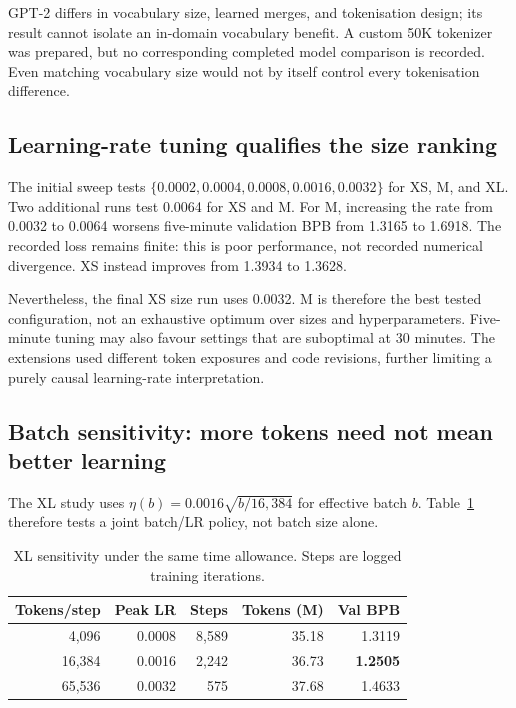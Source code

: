 \documentclass[11pt]{article}
\begin{document}
GPT-2 differs in vocabulary size, learned merges, and tokenisation design; its result cannot isolate an in-domain vocabulary benefit. A custom 50K tokenizer was prepared, but no corresponding completed model comparison is recorded. Even matching vocabulary size would not by itself control every tokenisation difference.

\subsection{Learning-rate tuning qualifies the size ranking}
The initial sweep tests $\{0.0002,0.0004,0.0008,0.0016,0.0032\}$ for XS, M, and XL. Two additional runs test 0.0064 for XS and M. For M, increasing the rate from 0.0032 to 0.0064 worsens five-minute validation BPB from 1.3165 to 1.6918. The recorded loss remains finite: this is poor performance, not recorded numerical divergence. XS instead improves from 1.3934 to 1.3628.

Nevertheless, the final XS size run uses 0.0032. M is therefore the best tested configuration, not an exhaustive optimum over sizes and hyperparameters. Five-minute tuning may also favour settings that are suboptimal at 30 minutes. The extensions used different token exposures and code revisions, further limiting a purely causal learning-rate interpretation.

\subsection{Batch sensitivity: more tokens need not mean better learning}
The XL study uses $\eta(b)=0.0016\sqrt{b/16{,}384}$ for effective batch $b$. Table~\ref{tab:batch} therefore tests a joint batch/LR policy, not batch size alone.

\begin{table}[htbp]
\centering\small
\caption{XL sensitivity under the same time allowance. Steps are logged training iterations.}
\label{tab:batch}
\begin{tabular}{rrrrr}
\toprule
Tokens/step & Peak LR & Steps & Tokens (M) & Val BPB\\
\midrule
4,096 & 0.0008 & 8,589 & 35.18 & 1.3119\\
16,384 & 0.0016 & 2,242 & 36.73 & \textbf{1.2505}\\
65,536 & 0.0032 & 575 & 37.68 & 1.4633\\
\bottomrule
\end{tabular}
\end{table}
\end{document}
